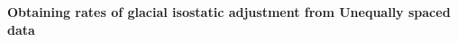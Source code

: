 \documentclass{article}
\begin{document}
\textbf{{Obtaining rates of glacial isostatic adjustment from Unequally spaced data\\}}

\newpage
\end{document}
